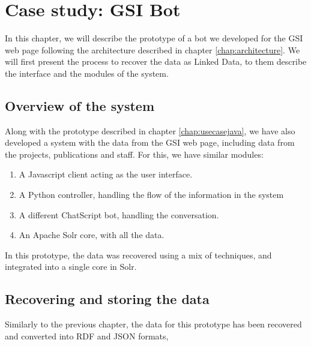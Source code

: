 \chapter{Case study: GSI Bot}
\label{chap:usecasegsi}

\begin{chapterintro}

In this chapter, we will describe the prototype of a bot we developed for the GSI web page following the architecture described in chapter \ref{chap:architecture}. We will first present the process to recover the data as Linked Data, to them describe the interface and the modules of the system.
 
\end{chapterintro}

\cleardoublepage

\section{Overview of the system}

Along with the prototype described in chapter \ref{chap:usecasejava}, we have also developed a system with the data from the GSI web page, including data from the projects, publications and staff. For this, we have similar modules:

\begin{enumerate}
 \item A Javascript client acting as the user interface.
 \item A Python controller, handling the flow of the information in the system
 \item A different ChatScript bot, handling the conversation.
 \item An Apache Solr core, with all the data.
\end{enumerate}

In this prototype, the data was recovered using a mix of techniques, and integrated into a single core in Solr.

\section{Recovering and storing the data}

Similarly to the previous chapter, the data for this prototype has been recovered and converted into \ac{RDF} and JSON formats, 


